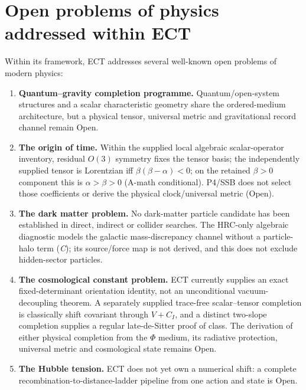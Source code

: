 \documentclass[11pt,a4paper]{article}
\begin{document}
\clearpage

\clearpage

\section{Open problems of physics addressed within ECT}

Within its framework, ECT addresses several well-known open problems of modern physics:

\begin{enumerate}
\item \textbf{Quantum--gravity completion programme.} Quantum/open-system structures and a scalar characteristic geometry share the ordered-medium architecture, but a physical tensor, universal metric and gravitational record channel remain Open.

\item \textbf{The origin of time.} Within the supplied local algebraic scalar-operator inventory, residual $O(3)$ symmetry fixes the tensor basis; the independently supplied tensor is Lorentzian iff $\beta(\beta-\alpha)<0$; on the retained $\beta>0$ component this is $\alpha>\beta>0$ (A-math conditional). P4/SSB does not select those coefficients or derive the physical clock/universal metric (Open).

\item \textbf{The dark matter problem.} No dark-matter particle candidate has been established in direct, indirect or collider searches.  The HRC-only algebraic diagnostic models the galactic mass-discrepancy channel without a particle-halo term (\emph{C}); its source/force map is not derived, and this does not exclude hidden-sector particles.

\item \textbf{The cosmological constant problem.}  ECT currently
supplies an exact fixed-determinant orientation identity, not an unconditional
vacuum-decoupling theorem.  A separately supplied trace-free scalar--tensor
completion is classically shift covariant through $V+C_I$, and a distinct
two-slope completion supplies a regular late-de-Sitter proof of class.  The
derivation of either physical completion from the $\Phi$ medium, its
radiative protection, universal metric and cosmological state remains Open.

\item \textbf{The Hubble tension.} ECT does not yet own a numerical shift: a complete recombination-to-distance-ladder pipeline from one action and state is Open.


\end{enumerate}
\end{document}
